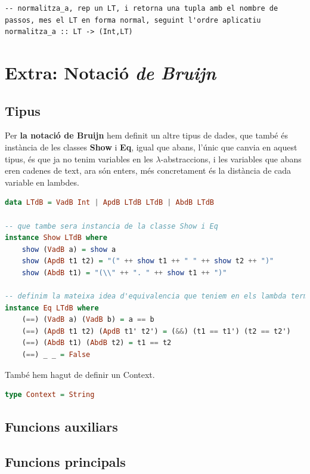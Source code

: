\documentclass[10pt,a4paper]{article}
\begin{document}
\lstset{language=Haskell, breaklines=true, basicstyle=\footnotesize}
\begin{lstlisting}[frame=mystyle]
-- normalitza_a, rep un LT, i retorna una tupla amb el nombre de passos, mes el LT en forma normal, seguint l'ordre aplicatiu
normalitza_a :: LT -> (Int,LT)
\end{lstlisting}

\clearpage

\section{Extra: Notació \textit{de Bruijn}}

\subsection{Tipus}

Per \textbf{la notació de Bruijn} hem definit un altre tipus de dades, que també és instància de les classes \textbf{Show} i \textbf{Eq}, igual que abans, l'únic que canvia en aquest tipus, és que ja no tenim variables en les $\lambda$-abstraccions, i les variables que abans eren cadenes de text, ara són enters, més concretament és la distància de cada variable en lambdes.

\begin{lstlisting}[language=Haskell]
data LTdB = VadB Int | ApdB LTdB LTdB | AbdB LTdB

-- que tambe sera instancia de la classe Show i Eq
instance Show LTdB where
    show (VadB a) = show a
    show (ApdB t1 t2) = "(" ++ show t1 ++ " " ++ show t2 ++ ")"
    show (AbdB t1) = "(\\" ++ ". " ++ show t1 ++ ")"

-- definim la mateixa idea d'equivalencia que teniem en els lambda termes pels lambda termes amb notacio de Bruijn
instance Eq LTdB where
    (==) (VadB a) (VadB b) = a == b
    (==) (ApdB t1 t2) (ApdB t1' t2') = (&&) (t1 == t1') (t2 == t2')
    (==) (AbdB t1) (AbdB t2) = t1 == t2
    (==) _ _ = False
\end{lstlisting}

També hem hagut de definir un Context.

\begin{lstlisting}[language=Haskell]
type Context = String
\end{lstlisting}

\clearpage

\subsection{Funcions auxiliars}

\clearpage

\subsection{Funcions principals}
\end{document}
